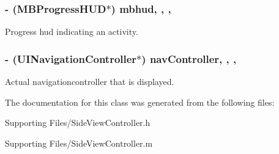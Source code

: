 \subsubsection[{mbhud}]{\setlength{\rightskip}{0pt plus 5cm}-\/ (M\+B\+Progress\+H\+U\+D$\ast$) mbhud\hspace{0.3cm}{\ttfamily [read]}, {\ttfamily [write]}, {\ttfamily [nonatomic]}, {\ttfamily [strong]}}\label{interface_side_view_controller_a9630052069b1e90fca66f009605cff41}
Progress hud indicating an activity. \hypertarget{interface_side_view_controller_a274f649758063f778580cb6fe7a5cc70}{}
\subsubsection[{nav\+Controller}]{\setlength{\rightskip}{0pt plus 5cm}-\/ (U\+I\+Navigation\+Controller$\ast$) nav\+Controller\hspace{0.3cm}{\ttfamily [read]}, {\ttfamily [write]}, {\ttfamily [nonatomic]}, {\ttfamily [strong]}}\label{interface_side_view_controller_a274f649758063f778580cb6fe7a5cc70}
Actual navigationcontroller that is displayed. 

The documentation for this class was generated from the following files\+:\begin{DoxyCompactItemize}
\item 
Supporting Files/Side\+View\+Controller.\+h\item 
Supporting Files/Side\+View\+Controller.\+m\end{DoxyCompactItemize}
